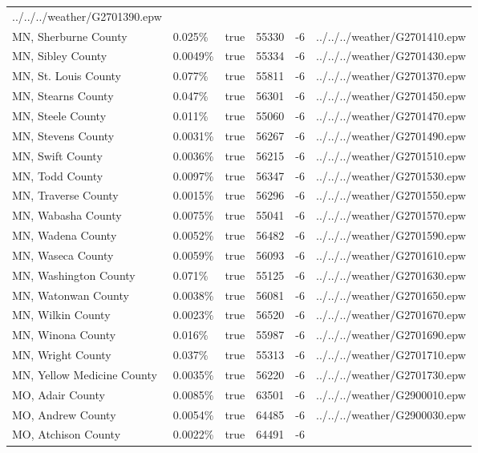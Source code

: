 \begin{longtable}[]{@{}llllll@{}}
../../../weather/G2701390.epw \\
MN, Sherburne County & 0.025\% & true & 55330 & -6 &
../../../weather/G2701410.epw \\
MN, Sibley County & 0.0049\% & true & 55334 & -6 &
../../../weather/G2701430.epw \\
MN, St. Louis County & 0.077\% & true & 55811 & -6 &
../../../weather/G2701370.epw \\
MN, Stearns County & 0.047\% & true & 56301 & -6 &
../../../weather/G2701450.epw \\
MN, Steele County & 0.011\% & true & 55060 & -6 &
../../../weather/G2701470.epw \\
MN, Stevens County & 0.0031\% & true & 56267 & -6 &
../../../weather/G2701490.epw \\
MN, Swift County & 0.0036\% & true & 56215 & -6 &
../../../weather/G2701510.epw \\
MN, Todd County & 0.0097\% & true & 56347 & -6 &
../../../weather/G2701530.epw \\
MN, Traverse County & 0.0015\% & true & 56296 & -6 &
../../../weather/G2701550.epw \\
MN, Wabasha County & 0.0075\% & true & 55041 & -6 &
../../../weather/G2701570.epw \\
MN, Wadena County & 0.0052\% & true & 56482 & -6 &
../../../weather/G2701590.epw \\
MN, Waseca County & 0.0059\% & true & 56093 & -6 &
../../../weather/G2701610.epw \\
MN, Washington County & 0.071\% & true & 55125 & -6 &
../../../weather/G2701630.epw \\
MN, Watonwan County & 0.0038\% & true & 56081 & -6 &
../../../weather/G2701650.epw \\
MN, Wilkin County & 0.0023\% & true & 56520 & -6 &
../../../weather/G2701670.epw \\
MN, Winona County & 0.016\% & true & 55987 & -6 &
../../../weather/G2701690.epw \\
MN, Wright County & 0.037\% & true & 55313 & -6 &
../../../weather/G2701710.epw \\
MN, Yellow Medicine County & 0.0035\% & true & 56220 & -6 &
../../../weather/G2701730.epw \\
MO, Adair County & 0.0085\% & true & 63501 & -6 &
../../../weather/G2900010.epw \\
MO, Andrew County & 0.0054\% & true & 64485 & -6 &
../../../weather/G2900030.epw \\
MO, Atchison County & 0.0022\% & true & 64491 & -6 &

\end{longtable}
